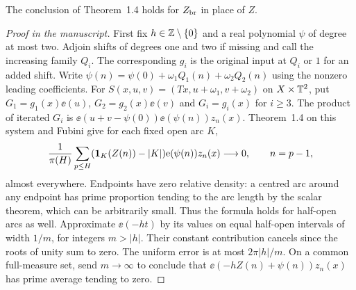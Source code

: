 \begin{corollary}\label{c:bracket-pointwise}
\leanok
{}
The conclusion of Theorem~1.4 holds for $Z_{\rm br}$ in place of $Z$.
\end{corollary}
\begin{proof}[Proof in the manuscript]
\leanok
First fix $h\in\mathbb Z\setminus\{0\}$ and a real polynomial
$\psi$ of degree at most two. Adjoin shifts of degrees one
and two if missing and call the increasing family $Q_i$.
The corresponding $g_i$ is the original input at $Q_i$ or $1$
for an added shift. Write
$\psi(n)=\psi(0)+\omega_1Q_1(n)+\omega_2Q_2(n)$
using the nonzero leading coefficients. For
$S(x,u,v)=(Tx,u+\omega_1,v+\omega_2)$ on $X\times\mathbb T^2$,
put $G_1=g_1(x)\ee(u)$, $G_2=g_2(x)\ee(v)$ and
$G_i=g_i(x)$ for $i\ge3$. The product of iterated
$G_i$ is $\ee(u+v-\psi(0))\ee(\psi(n))z_n(x)$.
Theorem~1.4 on this system and Fubini give for each fixed
open arc $K$,
\[
 \frac1{\pi(H)}\sum_{p\le H}
 (\mathbf 1_K(Z(n))-|K|)\mathrm e(\psi(n))z_n(x)\longrightarrow0,
 \qquad n=p-1,
\]
almost everywhere. Endpoints have zero relative density:
a centred arc around any endpoint has prime proportion tending
to the arc length by the scalar theorem, which can be arbitrarily
small. Thus the formula holds for half-open arcs as well.
Approximate $\ee(-ht)$ by its values on equal half-open
intervals of width $1/m$, for integers $m>|h|$.
Their constant contribution cancels since the roots of unity
sum to zero. The uniform error is at most $2\pi|h|/m$.
On a common full-measure set, send $m\to\infty$ to conclude
that $\ee(-hZ(n)+\psi(n))z_n(x)$ has prime average tending to zero.


\end{proof}
